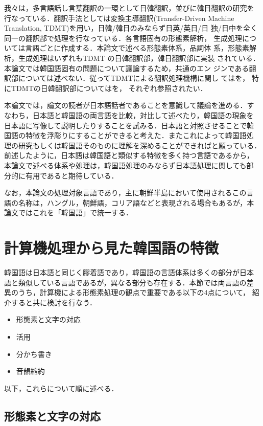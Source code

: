 我々は，多言語話し言葉翻訳の一環として日韓翻訳，並びに韓日翻訳の研究を
行なっている．翻訳手法としては変換主導翻訳(Transfer-Driven Machine
Translation, TDMT)\cite{古瀬99}を用い，日韓/韓日のみならず日英/英日/日
独/日中を全く同一の翻訳部で処理を行なっている．各言語固有の形態素解析，
生成処理については言語ごとに作成する．本論文で述べる形態素体系，品詞体
系，形態素解析，生成処理はいずれもTDMT の日韓翻訳部，韓日翻訳部に実装
されている．本論文では韓国語固有の問題について議論するため，共通のエン
ジンである翻訳部については述べない．従ってTDMTによる翻訳処理機構に関し
ては{}\cite{古瀬99}を，
特にTDMTの日韓翻訳部については{}\cite{IPSJ:TDMT日韓}を，
それぞれ参照されたい．

本論文では，論文の読者が日本語話者であることを意識して議論を進める．す
なわち，日本語と韓国語の両言語を比較，対比して述べたり，韓国語の現象を
日本語に写像して説明したりすることを試みる．日本語と対照させることで韓
国語の特徴を浮彫りにすることができると考えた．またこれによって韓国語処
理の研究もしくは韓国語そのものに理解を深めることができればと願っている．
前述したように，日本語は韓国語と類似する特徴を多く持つ言語であるから，
本論文で述べる体系や処理は，韓国語処理のみならず日本語処理に関しても部
分的に有用であると期待している．

なお，本論文の処理対象言語であり，主に朝鮮半島において使用されるこの言
語の名称は，ハングル，朝鮮語，コリア語などと表現される場合もあるが，本
論文ではこれを「韓国語」で統一する．



\section{計算機処理から見た韓国語の特徴}

韓国語は日本語と同じく膠着語であり，韓国語の言語体系は多くの部分が日本
語と類似している言語であるが，異なる部分も存在する．本節では両言語の差
異のうち，計算機による形態素処理の観点で重要である以下の4点について，
紹介すると共に検討を行なう．

\begin{itemize}
\item 形態素と文字の対応
\item 活用
\item 分かち書き
\item 音韻縮約
\end{itemize}

以下，これらについて順に述べる．

\subsection{形態素と文字の対応}

